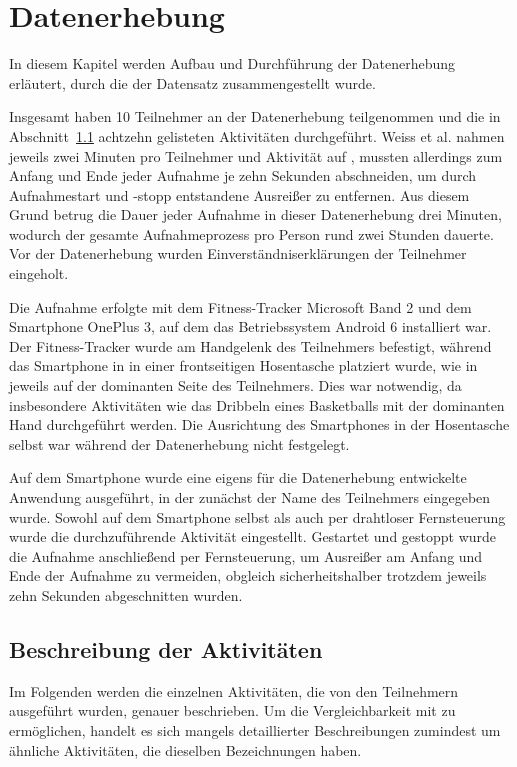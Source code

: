 \chapter{Datenerhebung}
\label{chap:experiment}
In diesem Kapitel werden Aufbau und Durchführung der Datenerhebung erläutert, durch die der Datensatz zusammengestellt wurde.

Insgesamt haben 10 Teilnehmer an der Datenerhebung teilgenommen und die in Abschnitt~\ref{sec:activities} achtzehn gelisteten Aktivitäten durchgeführt. Weiss et al. nahmen jeweils zwei Minuten pro Teilnehmer und Aktivität auf \cite{Weiss2016}, mussten allerdings zum Anfang und Ende jeder Aufnahme je zehn Sekunden abschneiden, um durch Aufnahmestart und -stopp entstandene Ausreißer zu entfernen. Aus diesem Grund betrug die Dauer jeder Aufnahme in dieser Datenerhebung drei Minuten, wodurch der gesamte Aufnahmeprozess pro Person rund zwei Stunden dauerte. Vor der Datenerhebung wurden Einverständniserklärungen der Teilnehmer eingeholt.

Die Aufnahme erfolgte mit dem Fitness-Tracker Microsoft Band 2 und dem Smartphone OnePlus 3, auf dem das Betriebssystem Android 6 installiert war. Der Fitness-Tracker wurde am Handgelenk des Teilnehmers befestigt, während das Smartphone in in einer frontseitigen Hosentasche platziert wurde, wie in \cite{Weiss2016} jeweils auf der dominanten Seite des Teilnehmers. Dies war notwendig, da insbesondere Aktivitäten wie das Dribbeln eines Basketballs mit der dominanten Hand durchgeführt werden. Die Ausrichtung des Smartphones in der Hosentasche selbst war während der Datenerhebung nicht festgelegt.

Auf dem Smartphone wurde eine eigens für die Datenerhebung entwickelte Anwendung ausgeführt, in der zunächst der Name des Teilnehmers eingegeben wurde. Sowohl auf dem Smartphone selbst als auch per drahtloser Fernsteuerung wurde die durchzuführende Aktivität eingestellt. Gestartet und gestoppt wurde die Aufnahme anschließend per Fernsteuerung, um Ausreißer am Anfang und Ende der Aufnahme zu vermeiden, obgleich sicherheitshalber trotzdem jeweils zehn Sekunden abgeschnitten wurden.

\section{Beschreibung der Aktivitäten}
\label{sec:activities}
Im Folgenden werden die einzelnen Aktivitäten, die von den Teilnehmern ausgeführt wurden, genauer beschrieben. Um die Vergleichbarkeit mit \cite{Weiss2016} zu ermöglichen, handelt es sich mangels detaillierter Beschreibungen zumindest um ähnliche Aktivitäten, die dieselben Bezeichnungen haben.


